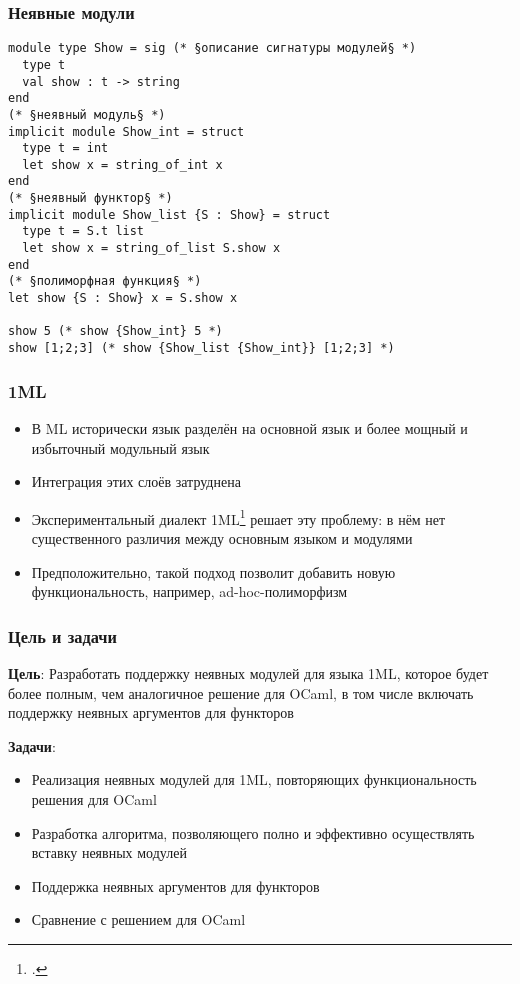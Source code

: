\documentclass{beamer}
\begin{document}
\lstset{language=caml}
\begin{frame}[fragile]\frametitle{Неявные модули}
\begin{lstlisting}
module type Show = sig (* §описание сигнатуры модулей§ *)
  type t
  val show : t -> string
end
(* §неявный модуль§ *)
implicit module Show_int = struct 
  type t = int
  let show x = string_of_int x
end
(* §неявный функтор§ *)
implicit module Show_list {S : Show} = struct 
  type t = S.t list
  let show x = string_of_list S.show x
end
(* §полиморфная функция§ *)
let show {S : Show} x = S.show x 

show 5 (* show {Show_int} 5 *)
show [1;2;3] (* show {Show_list {Show_int}} [1;2;3] *)
\end{lstlisting}
\end{frame}

\begin{frame}\frametitle{1ML}
\begin{itemize}
  \item В ML исторически язык разделён на основной язык и более мощный и избыточный модульный язык
  \item Интеграция этих слоёв затруднена
  \item Экспериментальный диалект 1ML\footcite{1ml} решает эту проблему: в нём нет существенного различия между основным языком и модулями
  \item Предположительно, такой подход позволит добавить новую функциональность, например, ad-hoc-полиморфизм
\end{itemize}
\end{frame}

\begin{frame}\frametitle{Цель и задачи}
\textbf{Цель}: Разработать поддержку неявных модулей для языка 1ML, которое будет более полным, чем аналогичное решение для OCaml, в том числе включать поддержку неявных аргументов для функторов

\textbf{Задачи}:
\begin{itemize}
  \item Реализация неявных модулей для 1ML, повторяющих функциональность решения для OCaml
  \item Разработка алгоритма, позволяющего полно и эффективно осуществлять вставку неявных модулей
  \item Поддержка неявных аргументов для функторов
  \item Сравнение с решением для OCaml
\end{itemize}
\end{frame}
\end{document}
